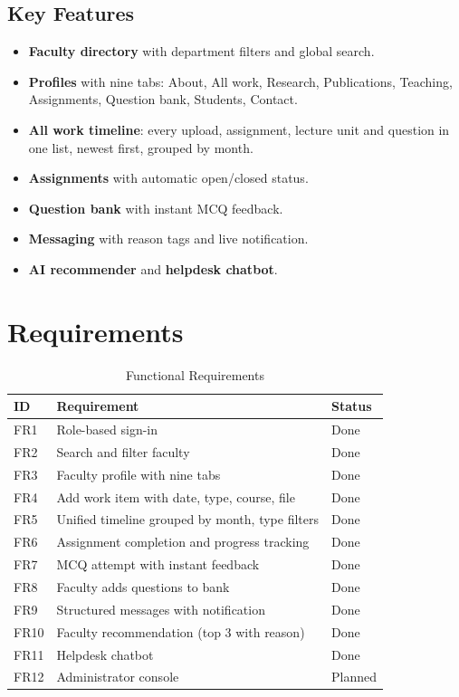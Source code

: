 \documentclass[conference]{IEEEtran}
\begin{document}
\subsection{Key Features}
\begin{itemize}
  \item \textbf{Faculty directory} with department filters and global search.
  \item \textbf{Profiles} with nine tabs: About, All work, Research, Publications, Teaching, Assignments, Question bank, Students, Contact.
  \item \textbf{All work timeline}: every upload, assignment, lecture unit and question in one list, newest first, grouped by month.
  \item \textbf{Assignments} with automatic open/closed status.
  \item \textbf{Question bank} with instant MCQ feedback.
  \item \textbf{Messaging} with reason tags and live notification.
  \item \textbf{AI recommender} and \textbf{helpdesk chatbot}.
\end{itemize}

\section{Requirements}

\begin{table}[!t]
\caption{Functional Requirements}
\label{tab:fr}
\centering\scriptsize
\begin{tabularx}{\columnwidth}{@{}l Y l@{}}
\toprule
\textbf{ID} & \textbf{Requirement} & \textbf{Status}\\
\midrule
FR1 & Role-based sign-in & Done\\
FR2 & Search and filter faculty & Done\\
FR3 & Faculty profile with nine tabs & Done\\
FR4 & Add work item with date, type, course, file & Done\\
FR5 & Unified timeline grouped by month, type filters & Done\\
FR6 & Assignment completion and progress tracking & Done\\
FR7 & MCQ attempt with instant feedback & Done\\
FR8 & Faculty adds questions to bank & Done\\
FR9 & Structured messages with notification & Done\\
FR10 & Faculty recommendation (top 3 with reason) & Done\\
FR11 & Helpdesk chatbot & Done\\
FR12 & Administrator console & Planned\\
\bottomrule
\end{tabularx}
\end{table}
\end{document}

